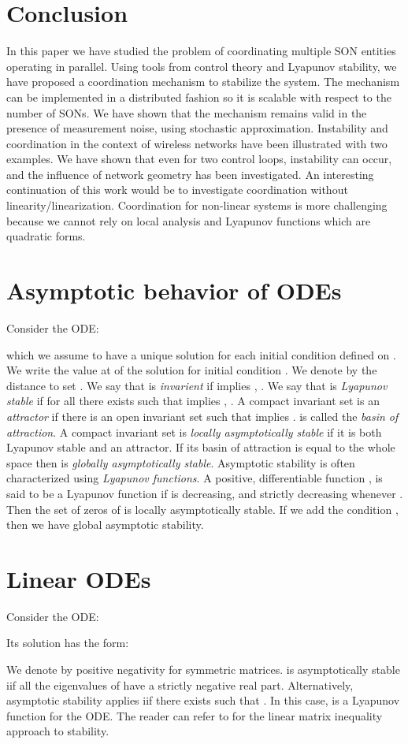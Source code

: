 \documentclass[10pt,conference,letterpaper]{IEEEtran}
\begin{document}
\section{Conclusion}\label{sec:conclusion}
	In this paper we have studied the problem of coordinating multiple \ac{SON} entities operating in parallel.  Using tools from control theory and Lyapunov stability, we have proposed a coordination mechanism to stabilize the system. The mechanism can be implemented in a distributed fashion so it is scalable with respect to the number of \acp{SON}. We have shown that the mechanism remains valid in the presence of measurement noise, using stochastic approximation. Instability and coordination in the context of wireless networks have been illustrated with two examples. We have shown that even for two control loops, instability can occur, and the influence of network geometry has been investigated. An interesting continuation of this work would be to investigate coordination without linearity/linearization. Coordination for non-linear systems is more challenging because we cannot rely on local analysis and Lyapunov functions which are quadratic forms.


\appendices
\section{Asymptotic behavior of ODEs}\label{app:odes}
	Consider the \ac{ODE}:

	which we assume to have a unique solution for each initial condition defined on . We write  the value at  of the solution for initial condition . We denote by  the distance to set . We say that  is \emph{invarient} if  implies  , . We say that  is \emph{Lyapunov stable} if for all  there exists  such that  implies  , . A compact invariant set  is an \emph{attractor} if there is an open invariant set  such that  implies  .  is called the \emph{basin of attraction}.  A compact invariant set  is \emph{locally asymptotically stable} if it is both Lyapunov stable and an attractor. If its basin of attraction  is equal to the whole space then  is \emph{globally asymptotically stable}. Asymptotic stability is often characterized using \emph{Lyapunov functions}. A positive, differentiable function , is said to be a Lyapunov function if   is decreasing, and strictly decreasing whenever . Then the set of zeros of  is locally asymptotically stable. If we add the condition , then we have global asymptotic stability.

\section{Linear ODEs}\label{app:linear_ode}
	Consider the \ac{ODE}:

Its solution has the form:

	We denote by  positive negativity for symmetric matrices.  is asymptotically stable iif all the eigenvalues of  have a strictly negative real part. Alternatively, asymptotic stability applies iif there exists  such that . In this case,  is a Lyapunov function for the \ac{ODE}. The reader can refer to \cite{LMIControlBoyd} for the linear matrix inequality approach to stability.
\end{document}
